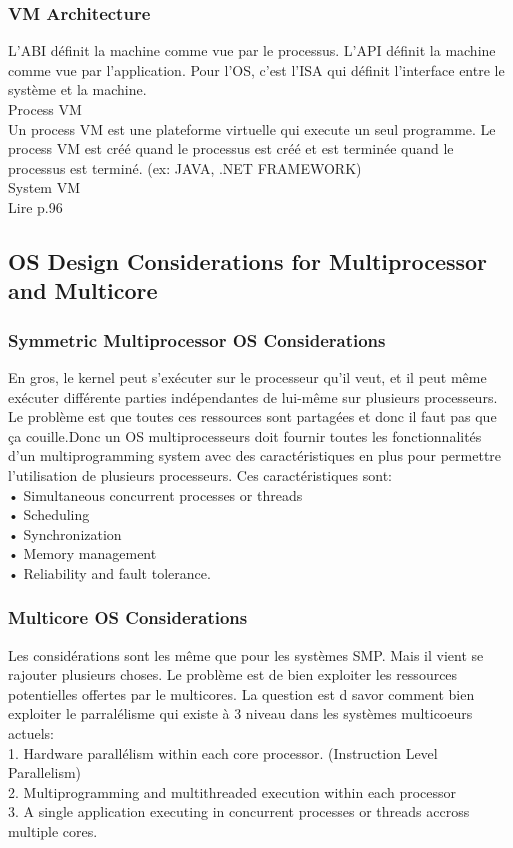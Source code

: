 \subsubsection{VM Architecture}
L’ABI définit la machine comme vue par le processus.
L’API définit la machine comme vue par l’application.
Pour l’OS, c’est l’ISA qui définit l’interface entre le système et la machine. \\
Process VM \\
Un process VM est une plateforme virtuelle qui execute un seul programme. Le process VM est créé quand le processus est créé et est terminée quand le processus est terminé. (ex: JAVA, .NET FRAMEWORK) \\
System VM \\
Lire p.96

\subsection{OS Design Considerations for Multiprocessor and Multicore}

\subsubsection{Symmetric Multiprocessor OS Considerations}
En gros, le kernel peut s’exécuter sur le processeur qu’il veut, et il peut même exécuter différente parties indépendantes de lui-même sur plusieurs processeurs. Le problème est que toutes ces ressources sont partagées et donc il faut pas que ça couille.Donc un OS multiprocesseurs doit fournir toutes les fonctionnalités d’un multiprogramming system avec des caractéristiques en plus pour permettre l’utilisation de plusieurs processeurs. Ces caractéristiques sont: \\
• Simultaneous concurrent processes or threads \\
• Scheduling\\
• Synchronization\\
• Memory management\\
• Reliability and fault tolerance.\\

\subsubsection{Multicore OS Considerations}
Les considérations sont les même que pour les systèmes SMP. Mais il vient se rajouter plusieurs choses. Le problème est de bien exploiter les ressources potentielles offertes par le multicores. La question est d savor comment bien exploiter le parralélisme qui existe à 3 niveau dans les systèmes multicoeurs actuels: \\
1. Hardware parallélism within each core processor. (Instruction Level Parallelism) \\
2. Multiprogramming and multithreaded execution within each processor \\
3. A single application executing in concurrent processes or threads accross multiple cores. \\

